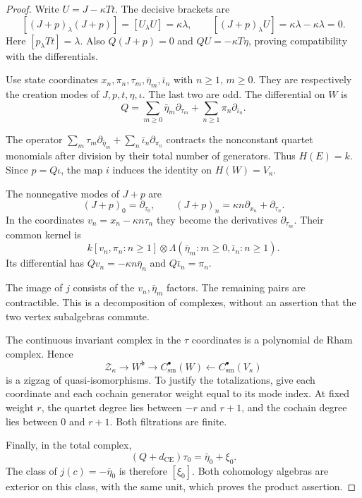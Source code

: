 \begin{proof}
Write $U=J-\kappa Tt$. The decisive brackets are
\[
 [(J+p)_\lambda(J+p)]=[U_\lambda U]=\kappa\lambda,
 \qquad
 [(J+p)_\lambda U]=\kappa\lambda-\kappa\lambda=0.
\]
Here $[p_\lambda Tt]=\lambda$. Also $Q(J+p)=0$ and
$QU=-\kappa T\eta$, proving compatibility with the differentials.

Use state coordinates $x_n,\pi_n,\tau_m,\bar\eta_m,\bar\iota_n$
with $n\geq1$, $m\geq0$. They are respectively the creation
modes of $J,p,t,\eta,\iota$. The last two are odd.
The differential on $W$ is
\[
 Q=\sum_{m\geq0}\bar\eta_m\partial_{\tau_m}
   +\sum_{n\geq1}\pi_n\partial_{\bar\iota_n}.
\]

The operator
$\sum_m\tau_m\partial_{\bar\eta_m}
+\sum_n\bar\iota_n\partial_{\pi_n}$ contracts the nonconstant
quartet monomials after division by their total number of
generators. Thus $H(E)=k$. Since $p=Q\iota$, the map $i$
induces the identity on $H(W)=V_\kappa$.

The nonnegative modes of $J+p$ are
\[
 (J+p)_0=\partial_{\tau_0},\qquad
 (J+p)_n=\kappa n\partial_{x_n}+\partial_{\tau_n}.
\]
In the coordinates $v_n=x_n-\kappa n\tau_n$ they become
the derivatives $\partial_{\tau_m}$. Their common kernel is
\[
 k[v_n,\pi_n:n\geq1]\otimes
 \Lambda(\bar\eta_m:m\geq0,\bar\iota_n:n\geq1).
\]
Its differential has
$Qv_n=-\kappa n\bar\eta_n$ and $Q\bar\iota_n=\pi_n$.

The image of $j$ consists of the $v_n,\bar\eta_m$ factors.
The remaining pairs are contractible. This is a decomposition
of complexes, without an assertion that the two vertex
subalgebras commute.

The continuous invariant complex in the $\tau$ coordinates
is a polynomial de Rham complex. Hence
\[
 \mathcal Z_\kappa\longrightarrow W^{\mathfrak b}
 \longrightarrow C^\bullet_{\mathrm{sm}}(W)
 \longleftarrow C^\bullet_{\mathrm{sm}}(V_\kappa)
\]
is a zigzag of quasi-isomorphisms. To justify the totalizations,
give each coordinate and each cochain generator weight equal
to its mode index. At fixed weight $r$, the quartet degree
lies between $-r$ and $r+1$, and the cochain degree lies
between $0$ and $r+1$. Both filtrations are finite.

Finally, in the total complex,
\[
 (Q+d_{\mathrm{CE}})\tau_0=\bar\eta_0+\xi_0.
\]
The class of $j(c)=-\bar\eta_0$ is therefore $[\xi_0]$.
Both cohomology algebras are exterior on this class, with
the same unit, which proves the product assertion.
\end{proof}

